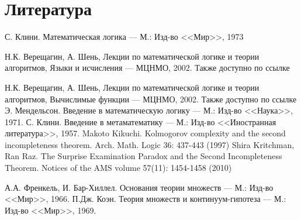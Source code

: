 \section{Литература}

\begin{thebibliography}{99}


 С. Клини. Математическая логика --- М.: Изд-во <<Мир>>, 1973


 Н.К. Верещагин, А. Шень, Лекции по математической логике и теории алгоритмов, Языки и исчисления --- МЦНМО, 2002.
 Также доступно по ссылке 


 Н.К. Верещагин, А. Шень, Лекции по математической логике и теории алгоритмов, Вычислимые функции --- МЦНМО, 2002.
 Также доступно по ссылке 
 Э. Мендельсон. Введение в математическую логику --- М.: Изд-во <<Наука>>, 1971.
 С. Клини. Введение в метаматематику --- М.: Изд-во <<Иностранная литература>>, 1957.
 Makoto Kikuchi. Kolmogorov complexity and the second incompleteness theorem. Arch. Math. Logic 36: 437-443 (1997)
 Shira Kritchman, Ran Raz. The Surprise Examination Paradox and the Second Incompleteness Theorem. Notices of the AMS volume 57(11): 1454-1458 (2010)


 А.А. Френкель, И. Бар-Хиллел. Основания теории множеств --- М.: Изд-во <<Мир>>, 1966.
 П.Дж. Коэн. Теория множеств и континуум-гипотеза --- М.: Изд-во <<Мир>>, 1969.

\end{thebibliography}
